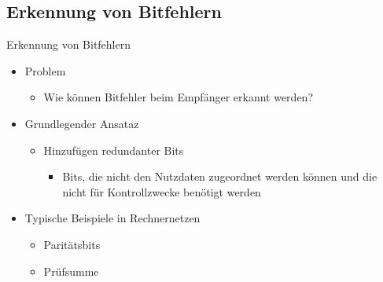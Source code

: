   \subsection{Erkennung von Bitfehlern}
    Erkennung von Bitfehlern
    \begin{itemize}
       \item Problem
         \begin{itemize}
           \item Wie können Bitfehler beim Empfänger erkannt werden?
         \end{itemize}
       \item Grundlegender Ansataz
         \begin{itemize}
           \item Hinzufügen redundanter Bits
             \begin{itemize}
               \item Bits, die nicht den Nutzdaten zugeordnet werden können und die nicht für
                 Kontrollzwecke benötigt werden
             \end{itemize}
         \end{itemize}
       \item Typische Beispiele in Rechnernetzen
         \begin{itemize}
           \item Paritätsbits
           \item Prüfsumme
         \end{itemize}
    \end{itemize}
